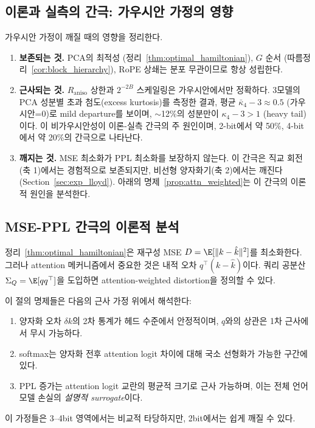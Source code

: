 \subsection{이론과 실측의 간극: 가우시안 가정의 영향}
\label{sec:theory_gap}

가우시안 가정이 깨질 때의 영향을 정리한다.

\begin{enumerate}[leftmargin=1.5em,itemsep=2pt]
\item \textbf{보존되는 것.} PCA의 최적성 (정리~\ref{thm:optimal_hamiltonian}), $G$ 순서 (따름정리~\ref{cor:block_hierarchy}), RoPE 상쇄는 분포 무관이므로 항상 성립한다.
\item \textbf{근사되는 것.} $R_{\mathrm{aniso}}$ 상한과 $2^{-2B}$ 스케일링은 가우시안에서만 정확하다. 3모델의 PCA 성분별 초과 첨도(excess kurtosis)를 측정한 결과, 평균 $\bar{\kappa}_4 - 3 \approx 0.5$ (가우시안=0)로 mild departure를 보이며, $\sim$12\%의 성분만이 $\kappa_4 - 3 > 1$ (heavy tail)이다. 이 비가우시안성이 이론-실측 간극의 주 원인이며, 2-bit에서 약 50\%, 4-bit에서 약 20\%의 간극으로 나타난다.
\item \textbf{깨지는 것.} MSE 최소화가 PPL 최소화를 보장하지 않는다. 이 간극은 직교 회전(축 1)에서는 경험적으로 보존되지만, 비선형 양자화기(축 2)에서는 깨진다 (Section~\ref{sec:exp_lloyd}). 아래의 명제~\ref{prop:attn_weighted}는 이 간극의 이론적 원인을 분석한다.
\end{enumerate}

\subsection{MSE-PPL 간극의 이론적 분석}
\label{sec:attn_weighted}

정리~\ref{thm:optimal_hamiltonian}은 재구성 MSE $D = \E[\lVert k - \hat{k} \rVert^2]$를 최소화한다. 그러나 attention 메커니즘에서 중요한 것은 내적 오차 $q^\top (k - \hat{k})$이다. 쿼리 공분산 $\Sigma_Q = \E[qq^\top]$을 도입하면 attention-weighted distortion을 정의할 수 있다.

\begin{assumption}
\label{ass:attn_surrogate}
이 절의 명제들은 다음의 근사 가정 위에서 해석한다:
\begin{enumerate}[leftmargin=1.5em,itemsep=2pt]
\item 양자화 오차 $\delta k$의 2차 통계가 헤드 수준에서 안정적이며, $q$와의 상관은 1차 근사에서 무시 가능하다.
\item softmax는 양자화 전후 attention logit 차이에 대해 국소 선형화가 가능한 구간에 있다.
\item PPL 증가는 attention logit 교란의 평균적 크기로 근사 가능하며, 이는 전체 언어모델 손실의 \emph{설명적 surrogate}이다.
\end{enumerate}
이 가정들은 3--4bit 영역에서는 비교적 타당하지만, 2bit에서는 쉽게 깨질 수 있다.
\end{assumption}

